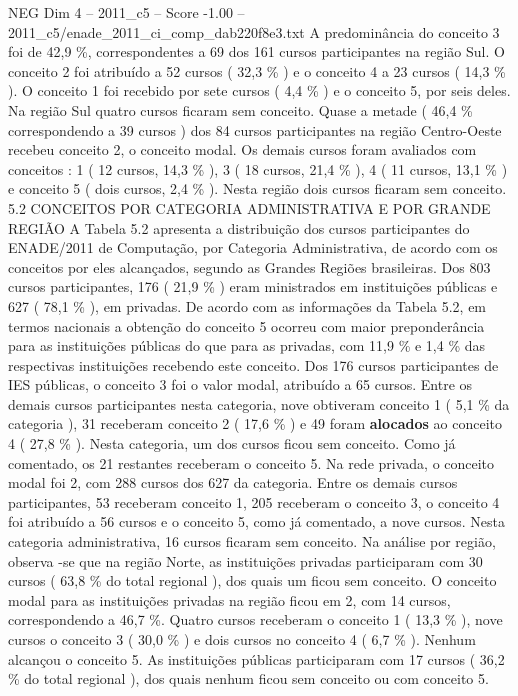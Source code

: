 \begin{textsample}{NEG Dim 4 – 2011\_c5 – Score -1.00 – 2011\_c5/enade\_2011\_ci\_comp\_dab220f8e3.txt}
A predominância do conceito 3 foi de 42,9 \%, correspondentes a 69 dos 161 cursos participantes na região Sul.
O conceito 2 foi atribuído a 52 cursos ( 32,3 \% ) e o conceito 4 a 23 cursos ( 14,3 \% ).
O conceito 1 foi recebido por sete cursos ( 4,4 \% ) e o conceito 5, por seis deles.
Na região Sul quatro cursos ficaram sem conceito.
Quase a metade ( 46,4 \% correspondendo a 39 cursos ) dos 84 cursos participantes na região Centro-Oeste recebeu conceito 2, o conceito modal.
Os demais cursos foram avaliados com conceitos : 1 ( 12 cursos, 14,3 \% ), 3 ( 18 cursos, 21,4 \% ), 4 ( 11 cursos, 13,1 \% ) e conceito 5 ( dois cursos, 2,4 \% ).
Nesta região dois cursos ficaram sem conceito. 5.2 CONCEITOS POR CATEGORIA ADMINISTRATIVA E POR GRANDE REGIÃO A Tabela 5.2 apresenta a distribuição dos cursos participantes do ENADE/2011 de Computação, por Categoria Administrativa, de acordo com os conceitos por eles alcançados, segundo as Grandes Regiões brasileiras.
Dos 803 cursos participantes, 176 ( 21,9 \% ) eram ministrados em instituições públicas e 627 ( 78,1 \% ), em privadas.
De acordo com as informações da Tabela 5.2, em termos nacionais a obtenção do conceito 5 ocorreu com maior preponderância para as instituições públicas do que para as privadas, com 11,9 \% e 1,4 \% das respectivas instituições recebendo este conceito.
Dos 176 cursos participantes de IES públicas, o conceito 3 foi o valor modal, atribuído a 65 cursos.
Entre os demais cursos participantes nesta categoria, nove obtiveram conceito 1 ( 5,1 \% da categoria ), 31 receberam conceito 2 ( 17,6 \% ) e 49 foram \textbf{alocados} ao conceito 4 ( 27,8 \% ).
Nesta categoria, um dos cursos ficou sem conceito.
Como já comentado, os 21 restantes receberam o conceito 5.
Na rede privada, o conceito modal foi 2, com 288 cursos dos 627 da categoria.
Entre os demais cursos participantes, 53 receberam conceito 1, 205 receberam o conceito 3, o conceito 4 foi atribuído a 56 cursos e o conceito 5, como já comentado, a nove cursos.
Nesta categoria administrativa, 16 cursos ficaram sem conceito.
Na análise por região, observa -se que na região Norte, as instituições privadas participaram com 30 cursos ( 63,8 \% do total regional ), dos quais um ficou sem conceito.
O conceito modal para as instituições privadas na região ficou em 2, com 14 cursos, correspondendo a 46,7 \%.
Quatro cursos receberam o conceito 1 ( 13,3 \% ), nove cursos o conceito 3 ( 30,0 \% ) e dois cursos no conceito 4 ( 6,7 \% ).
Nenhum alcançou o conceito 5.
As instituições públicas participaram com 17 cursos ( 36,2 \% do total regional ), dos quais nenhum ficou sem conceito ou com conceito 5.

\end{textsample}
